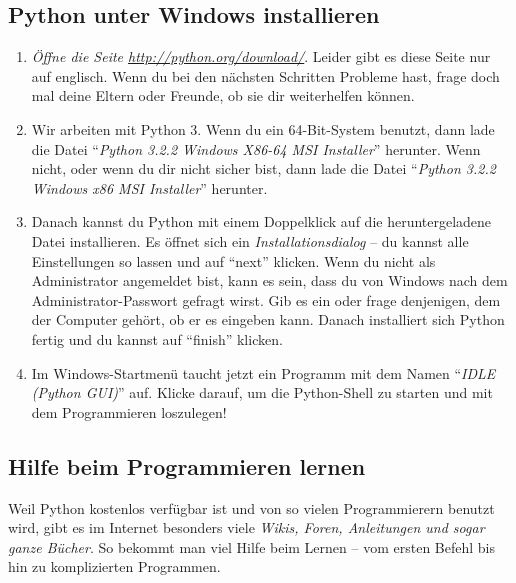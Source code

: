 	\subsection*{Python unter Windows installieren}
	\begin{enumerate}
		\item \emph{Öffne die Seite \url{http://python.org/download/}}. Leider gibt es diese Seite nur auf englisch. Wenn du bei den nächsten Schritten Probleme hast, frage doch mal deine Eltern oder Freunde, ob sie dir weiterhelfen können.
		
		\item Wir arbeiten mit Python 3. Wenn du ein 64-Bit-System benutzt, dann lade die Datei \enquote{\emph{Python 3.2.2 Windows X86-64 MSI Installer}} herunter. Wenn nicht, oder wenn du dir nicht sicher bist, dann lade die Datei \enquote{\emph{Python 3.2.2 Windows x86 MSI Installer}} herunter.
		
		\item Danach kannst du Python mit einem Doppelklick auf die heruntergeladene Datei installieren. Es öffnet sich ein \emph{Installationsdialog} – du kannst alle Einstellungen so lassen und auf \enquote{next} klicken. Wenn du nicht als Administrator angemeldet bist, kann es sein, dass du von Windows nach dem Administrator-Passwort gefragt wirst. Gib es ein oder frage denjenigen, dem der Computer gehört, ob er es eingeben kann. Danach installiert sich Python fertig und du kannst auf \enquote{finish} klicken.
		
		\item Im Windows-Startmenü taucht jetzt ein Programm mit dem Namen \enquote{\emph{IDLE (Python GUI)}} auf. Klicke darauf, um die Python-Shell zu starten und mit dem Programmieren loszulegen!
	\end{enumerate}
	
	\subsection*{Hilfe beim Programmieren lernen}
	Weil Python kostenlos verfügbar ist und von so vielen Programmierern benutzt wird, gibt es im Internet besonders viele \emph{Wikis, Foren, Anleitungen und sogar ganze Bücher}. So bekommt man viel Hilfe beim Lernen – vom ersten Befehl bis hin zu komplizierten Programmen.
	
